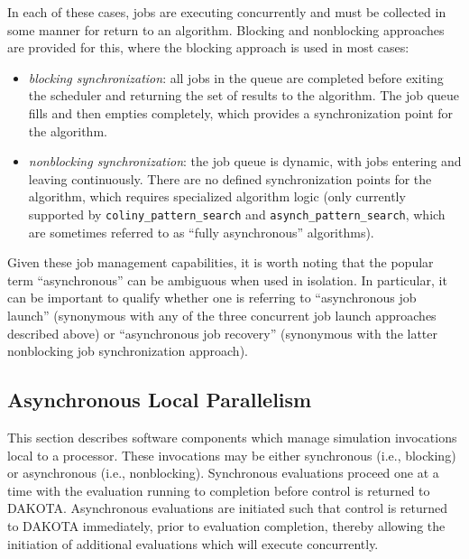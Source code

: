 In each of these cases, jobs are executing concurrently and must be
collected in some manner for return to an algorithm.  Blocking and
nonblocking approaches are provided for this, where the blocking
approach is used in most cases:
\begin{itemize}
\item \emph{blocking synchronization}: all jobs in the queue are
completed before exiting the scheduler and returning the set of
results to the algorithm.  The job queue fills and then empties
completely, which provides a synchronization point for the algorithm.

\item \emph{nonblocking synchronization}: the job queue is dynamic,
with jobs entering and leaving continuously.  There are no defined
synchronization points for the algorithm, which requires specialized
algorithm logic (only currently supported by
\texttt{coliny\_pattern\_search} and \texttt{asynch\_pattern\_search}, which
are sometimes referred to as ``fully asynchronous'' algorithms).
\end{itemize}

Given these job management capabilities, it is worth noting that the
popular term ``asynchronous'' can be ambiguous when used in isolation.
In particular, it can be important to qualify whether one is referring
to ``asynchronous job launch'' (synonymous with any of the three
concurrent job launch approaches described above) or ``asynchronous
job recovery'' (synonymous with the latter nonblocking job
synchronization approach).


\subsection{Asynchronous Local Parallelism}\label{parallel:SLP:local}

This section describes software components which manage simulation
invocations local to a processor. These invocations may be either
synchronous (i.e., blocking) or asynchronous (i.e., nonblocking).
Synchronous evaluations proceed one at a time with the evaluation
running to completion before control is returned to DAKOTA.
Asynchronous evaluations are initiated such that control is returned
to DAKOTA immediately, prior to evaluation completion, thereby
allowing the initiation of additional evaluations which will execute
concurrently.

